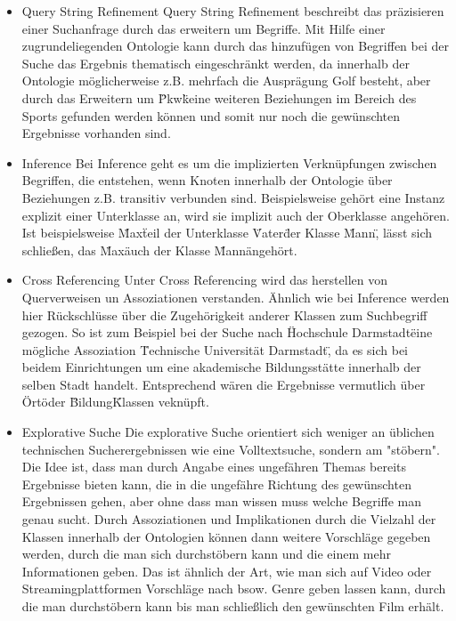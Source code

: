 \begin{itemize}
    \item Query String Refinement\newline
          Query String Refinement beschreibt das präzisieren einer Suchanfrage durch das erweitern um Begriffe. Mit Hilfe einer zugrundeliegenden Ontologie kann durch das hinzufügen von Begriffen bei der Suche das Ergebnis thematisch eingeschränkt werden, da innerhalb der Ontologie möglicherweise z.B. mehrfach die Ausprägung Golf besteht, aber durch das Erweitern um \"Pkw\" keine weiteren Beziehungen im Bereich des Sports gefunden werden können und somit nur noch die gewünschten Ergebnisse vorhanden sind. 
    \item Inference\newline
          Bei Inference geht es um die implizierten Verknüpfungen zwischen Begriffen, die entstehen, wenn Knoten innerhalb der Ontologie über Beziehungen z.B. transitiv verbunden sind. Beispielsweise gehört eine Instanz explizit einer Unterklasse an, wird sie implizit auch der Oberklasse angehören. Ist beispielsweise \"Max\" teil der Unterklasse \"Vater\" der Klasse \"Mann\", lässt sich schließen, das \"Max\" auch der Klasse \"Mann\" angehört.
    \item Cross Referencing\newline
          Unter Cross Referencing wird das herstellen von Querverweisen un Assoziationen verstanden. Ähnlich wie bei Inference werden hier Rückschlüsse über die Zugehörigkeit anderer Klassen zum Suchbegriff gezogen. So ist zum Beispiel bei der Suche nach \"Hochschule Darmstadt\" eine mögliche Assoziation \"Technische Universität Darmstadt\", da es sich bei beidem Einrichtungen um eine akademische Bildungsstätte innerhalb der selben Stadt handelt. Entsprechend wären die Ergebnisse vermutlich über \"Ort\" oder \"Bildung\" Klassen veknüpft.
    \item Explorative Suche\newline
          Die explorative Suche orientiert sich weniger an üblichen technischen Sucherergebnissen wie eine Volltextsuche, sondern am "stöbern". Die Idee ist, dass man durch Angabe eines ungefähren Themas bereits Ergebnisse bieten kann, die in die ungefähre Richtung des gewünschten Ergebnissen gehen, aber ohne dass man wissen muss welche Begriffe man genau sucht. Durch Assoziationen und Implikationen durch die Vielzahl der Klassen innerhalb der Ontologien können dann weitere Vorschläge gegeben werden, durch die man sich durchstöbern kann und die einem mehr Informationen geben. Das ist ähnlich der Art, wie man sich auf Video oder Streamingplattformen Vorschläge nach bsow. Genre geben lassen kann, durch die man durchstöbern kann bis man schließlich den gewünschten Film erhält.
\end{itemize}
\cite{Sack.2010}
